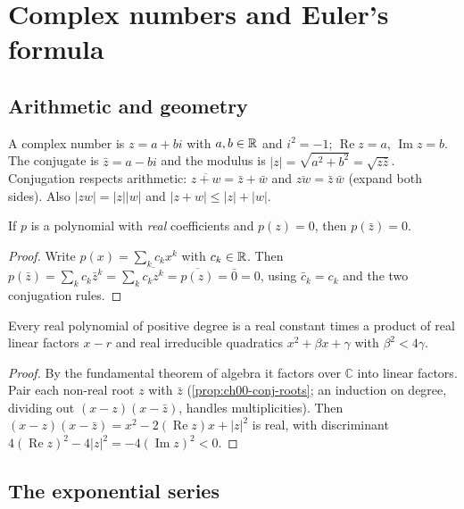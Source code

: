 \section{Complex numbers and Euler's formula}\label{sec:ch00-complex}

\subsection{Arithmetic and geometry}

A complex number is $z = a + bi$ with $a,b\in\mathbb{R}$ and $i^2=-1$; $\operatorname{Re} z = a$,
$\operatorname{Im} z = b$. The conjugate is $\bar z = a - bi$ and the modulus
is $|z| = \sqrt{a^2+b^2} = \sqrt{z\bar z}$. Conjugation respects arithmetic:
$\overline{z+w} = \bar z + \bar w$ and $\overline{zw} = \bar z\,\bar w$ (expand
both sides). Also $|zw| = |z||w|$ and $|z + w|\le |z| + |w|$.

\begin{proposition}\label{prop:ch00-conj-roots}
If $p$ is a polynomial with \emph{real} coefficients and $p(z) = 0$, then
$p(\bar z) = 0$.
\end{proposition}
\begin{proof}
Write $p(x) = \sum_k c_k x^k$ with $c_k\in\mathbb{R}$. Then
$p(\bar z) = \sum_k c_k\bar z^k = \sum_k\overline{c_k z^k} = \overline{p(z)}
= \bar 0 = 0$, using $\bar c_k = c_k$ and the two conjugation rules.
\end{proof}

\begin{corollary}\label{cor:ch00-real-factor}
Every real polynomial of positive degree is a real constant times a product
of real linear factors $x - r$ and real irreducible quadratics
$x^2 + \beta x + \gamma$ with $\beta^2 < 4\gamma$.
\end{corollary}
\begin{proof}
By the fundamental theorem of algebra it factors over $\mathbb{C}$ into linear
factors. Pair each non-real root $z$ with $\bar z$
(\cref{prop:ch00-conj-roots}; an induction on degree, dividing out
$(x-z)(x-\bar z)$, handles multiplicities). Then
$(x-z)(x-\bar z) = x^2 - 2(\operatorname{Re}z)x + |z|^2$ is real, with
discriminant $4(\operatorname{Re}z)^2 - 4|z|^2 = -4(\operatorname{Im}z)^2<0$.
\end{proof}

\subsection{The exponential series}

